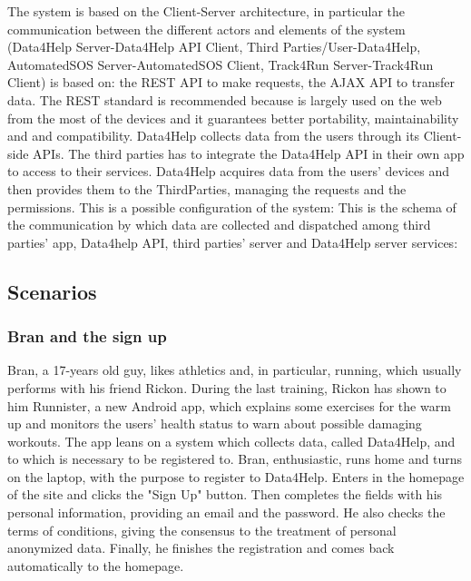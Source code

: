 \documentclass[a4paper]{article}
\begin{document}
    The system is based on the Client-Server architecture, in particular the communication between the different actors and elements of the system (Data4Help Server-Data4Help API Client, Third Parties/User-Data4Help, AutomatedSOS Server-AutomatedSOS Client, Track4Run Server-Track4Run Client) is based on: the REST API to make requests, the AJAX API to transfer data. The REST standard is recommended because is largely used on the web from the most of the devices and it guarantees better portability, maintainability and and compatibility.
    Data4Help collects data from the users through its Client-side APIs. The third parties has to integrate the Data4Help API in their own app to access to their services. Data4Help acquires data from the users' devices and then provides them to the ThirdParties, managing the requests and the permissions. 
    This is a possible configuration of the system:
    This is the schema of the communication by which data are collected and dispatched among third parties' app, Data4help API, third parties' server and Data4Help server services:
   
    \clearpage
    
    \subsection{Scenarios}
    
    \subsubsection{Bran and the sign up}
    Bran, a 17-years old guy, likes athletics and, in particular, running, which usually performs with his friend Rickon. \newline
    During the last training, Rickon has shown to him Runnister, a new Android app, which explains some exercises for the warm up and monitors the users' health status to warn about possible damaging workouts. The app leans on a system which collects data, called Data4Help, and to which is necessary to be registered to. \newline
    Bran, enthusiastic, runs home and turns on the laptop, with the purpose to register to Data4Help. Enters in the homepage of the site and clicks the "Sign Up" button. Then completes the fields with his personal information, providing an email and the password. He also checks the terms of conditions, giving the consensus to the treatment of personal anonymized data. Finally, he finishes the registration and comes back automatically to the homepage.
    
\end{document}
